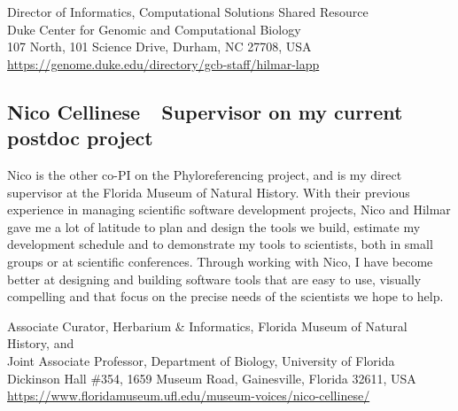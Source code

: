 \documentclass[12pt,letter]{article}
\begin{document}
\begin{adjustwidth}{1em}{}
Director of Informatics, Computational Solutions Shared Resource \\
Duke Center for Genomic and Computational Biology \\
107 North, 101 Science Drive, Durham, NC 27708, USA \\
\url{https://genome.duke.edu/directory/gcb-staff/hilmar-lapp} \\
\end{adjustwidth}

\vspace{0.5em}

\subsection*{Nico Cellinese~\smallbullet~Supervisor on my current postdoc project}

Nico is the other co-PI on the Phyloreferencing project, and is my direct supervisor at the Florida Museum of Natural History. With their previous experience in managing scientific software development projects, Nico and Hilmar gave me a lot of latitude to plan and design the tools we build, estimate my development schedule and to demonstrate my tools to scientists, both in small groups or at scientific conferences. Through working with Nico, I have become better at designing and building software tools that are easy to use, visually compelling and that focus on the precise needs of the scientists we hope to help.

\begin{adjustwidth}{1em}{}
Associate Curator, Herbarium \& Informatics, Florida Museum of Natural History, and \\
Joint Associate Professor, Department of Biology, University of Florida \\
Dickinson Hall \#354, 1659 Museum Road, Gainesville, Florida 32611, USA \\
\url{https://www.floridamuseum.ufl.edu/museum-voices/nico-cellinese/} \\
\end{adjustwidth}

\begin{comment}
\begin{center}

\vspace{1em}

\small

\textit{Prepared on \today.}

\end{center}
\end{comment}
\end{document}
